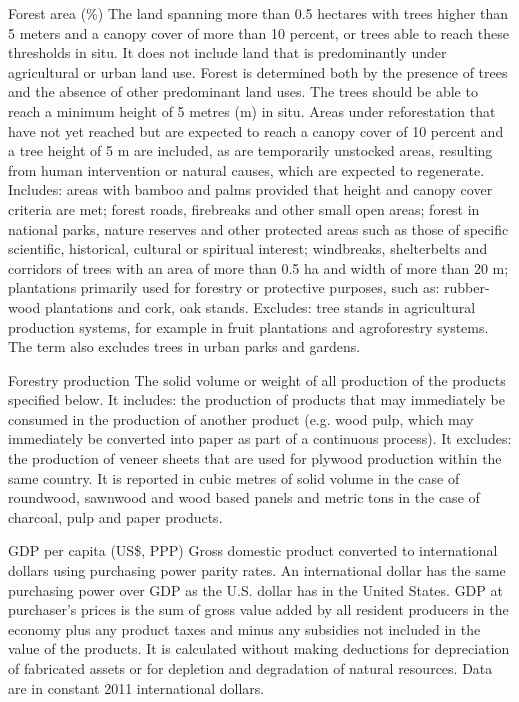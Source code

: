 \begin{MetadataCollection} {}
\begin{metadata}{Forest area (\%)} {}
The land spanning more than 0.5 hectares with trees higher than 5 meters and a canopy cover of more than 10 percent, or trees able to reach these thresholds in situ. It does not include land that is predominantly under agricultural or urban land use. Forest is determined both by the presence of trees and the absence of other predominant land uses. The trees should be able to reach a minimum height of 5 metres (m) in situ. Areas under reforestation that have not yet reached but are expected to reach a canopy cover of 10 percent and a tree height of 5 m are included, as are temporarily unstocked areas, resulting from human intervention or natural causes, which are expected to regenerate. Includes: areas with bamboo and palms provided that height and canopy cover criteria are met; forest roads, firebreaks and other small open areas; forest in national parks, nature reserves and other protected areas such as those of specific scientific, historical, cultural or spiritual interest; windbreaks, shelterbelts and corridors of trees with an area of more than 0.5 ha and width of more than 20 m; plantations primarily used for forestry or protective purposes, such as: rubber-wood plantations and cork, oak stands. Excludes: tree stands in agricultural production systems, for example in fruit plantations and agroforestry systems. The term also excludes trees in urban parks and gardens.
\end{metadata}

\begin{metadata}{Forestry production} {}
The solid volume or weight of all production of the products specified below. It includes: the production of products that may immediately be consumed in the production of another product (e.g. wood pulp, which may immediately be converted into paper as part of a continuous process). It excludes: the production of veneer sheets that are used for plywood production within the same country. It is reported in cubic metres of solid volume in the case of roundwood, sawnwood and wood based panels and metric tons in the case of charcoal, pulp and paper products.
\end{metadata}


\begin{metadata}{GDP per capita (US\$, PPP)} {}
Gross domestic product converted to international dollars using purchasing power parity rates. An international dollar has the same purchasing power over GDP as the U.S. dollar has in the United States. GDP at purchaser's prices is the sum of gross value added by all resident producers in the economy plus any product taxes and minus any subsidies not included in the value of the products. It is calculated without making deductions for depreciation of fabricated assets or for depletion and degradation of natural resources. Data are in constant 2011 international dollars.
\end{metadata}


\end{MetadataCollection}
